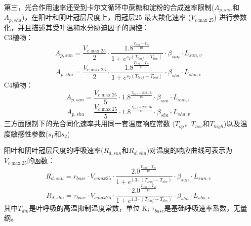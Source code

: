第三，光合作用速率还受到卡尔文循环中蔗糖和淀粉的合成速率限制($A_{p,sun}$和$A_{p,sha}$)，在阳叶和阴叶冠层尺度上，用冠层25 \textcelsius 最大羧化速率 ($V_{c \max25}$) 进行参数化，并且描述其受叶温和水分胁迫因子的调控：\\
C3植物：\\
\begin{equation}\label{A_e_a_sun}
A_{p,sun}=\frac{V_{c \max 25}}{2} \cdot \frac{1.8^{\frac{T_{{leaf }}-T_{o p}}{10}}}{1+e^{s_{2}\left(T_{{leaf }}-T_{{low }}\right)}} \cdot \beta_{sun} \cdot L_{sun,v}
\end{equation}
\begin{equation}\label{A_e_a_sha}
A_{p,sha}=\frac{V_{c \max 25}}{2} \cdot \frac{1.8^{\frac{T_{{leaf }}-T_{o p}}{10}}}{1+e^{s_{2}\left(T_{{leaf }}-T_{{low }}\right)}} \cdot \beta_{sha} \cdot L_{sha,v}
\end{equation}
C4植物：\\
\begin{equation}\label{A_e_b_sun}
A_{p,sun}=\frac{V_{c \max 25}}{5} \cdot 1.8^{\frac{T_{{leaf }}-298.16}{10}} \cdot \beta_{sun} \cdot L_{sun,v}
\end{equation}
\begin{equation}\label{A_e_b_sha}
A_{p,sha}=\frac{V_{c \max 25}}{5} \cdot 1.8^{\frac{T_{{leaf }}-298.16}{10}} \cdot \beta_{sha} \cdot L_{sha,v}
\end{equation}
三方面限制下的光合同化速率共用同一套温度响应常数 ($T_{op}$，$T_{low}$和$T_{high}$)以及温度敏感性参数($s_1$和$s_2$)


阳叶和阴叶冠层尺度的呼吸速率($R_{d,sun}$和$R_{d,sha}$)对温度的响应曲线可表示为$V_{c \max25}$的函数：
\begin{equation}\label{R_d1_sun}
R_{d,sun}=r_{{base }} \cdot V_{cmax 25} \cdot \frac{2.0^{\frac{T_{leaf}-T_{op}}{10}}}{1+e^{1.3 \cdot\left(T_{leaf}-T_{d m}\right)}} \cdot \beta_{sun} \cdot L_{sun,v}
\end{equation}
\begin{equation}\label{R_d1_sha}
R_{d,sha}=\tau_{{base }} \cdot V_{cmax 25} \cdot \frac{2.0^{\frac{T_{leaf}-T_{op}}{10}}}{1+e^{1.3 \cdot\left(T_{leaf}-T_{d m}\right)}} \cdot \beta_{sha} \cdot L_{sha,v}
\end{equation}
其中$T_{dm}$是叶呼吸的高温抑制温度常数，单位 K; $\tau_{base}$是基础呼吸速率系数，无量纲。

